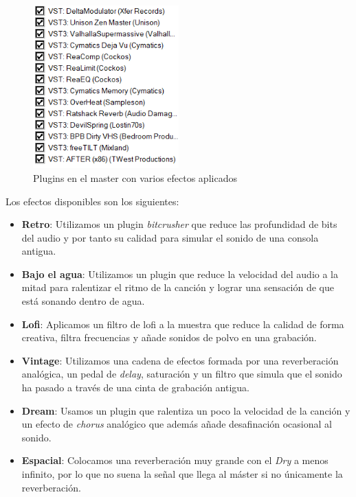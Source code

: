 \begin{figure}[h]
    \centering
    \includegraphics[width = 0.5\textwidth]{Imagenes/Bitmap/EfectosMasterEfectos.png}
    \caption{Plugins en el master con varios efectos aplicados}
    \label{fig:Efectos-master-efectos}
\end{figure}


Los efectos disponibles son los siguientes:

\begin{itemize}
    \item \textbf{Retro}: Utilizamos un plugin \textit{bitcrusher} que reduce las profundidad de bits del audio y por tanto su calidad para simular el sonido de una consola antigua. 
    \item \textbf{Bajo el agua}: Utilizamos un plugin que reduce la velocidad del audio a la mitad para ralentizar el ritmo de la canción y lograr una sensación de que está sonando dentro de agua.
    \item \textbf{Lofi}: Aplicamos un filtro de lofi a la muestra que reduce la calidad de forma creativa, filtra frecuencias y añade sonidos de polvo en una grabación.
    \item \textbf{Vintage}: Utilizamos una cadena de efectos formada por una reverberación analógica, un pedal de \textit{delay}, saturación y un filtro que simula que el sonido ha pasado a través de una cinta de grabación antigua. 
    \item \textbf{Dream}: Usamos un plugin que ralentiza un poco la velocidad de la canción y un efecto de \textit{chorus} analógico que además añade desafinación ocasional al sonido.
    \item \textbf{Espacial}: Colocamos una reverberación muy grande con el \textit{Dry} a menos infinito, por lo que no suena la señal que llega al máster si no únicamente la reverberación.
\end{itemize}